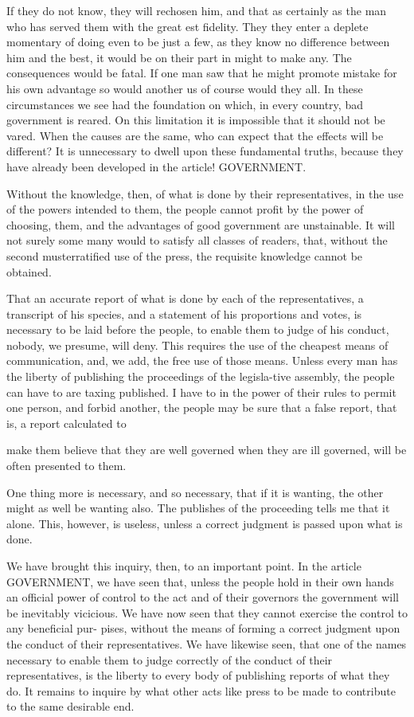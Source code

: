 \documentclass{article}
\begin{document}
If they do not know, they will rechosen him, and that as certainly as the man who has served them with the great est fidelity. They they enter a deplete momentary of doing even to be just a few, as they know no difference between him and the best, it would be on their part in might to make any. The consequences would be fatal. If one man saw that he might promote mistake for his own advantage so would another us of course would they all. In these circumstances we see had the foundation on which, in every country, bad government is reared. On this limitation it is impossible that it should not be vared. When the causes are the same, who can expect that the effects will be different? It is unnecessary to dwell upon these fundamental truths, because they have already been developed in the article! GOVERNMENT.

Without the knowledge, then, of what is done by their representatives, in the use of the powers intended to them, the people cannot profit by the power of choosing, them, and the advantages of good government are unstainable. It will not surely some many would to satisfy all classes of readers, that, without the second musterratified use of the press, the requisite knowledge cannot be obtained.

That an accurate report of what is done by each of the representatives, a transcript of his species, and a statement of his proportions and votes, is necessary to be laid before the people, to enable them to judge of his conduct, nobody, we presume, will deny. This requires the use of the cheapest means of communication, and, we add, the free use of those means. Unless every man has the liberty of publishing the proceedings of the legisla-tive assembly, the people can have to are taxing published. I have to in the power of their rules to permit one person, and forbid another, the people may be sure that a false report, that is, a report calculated to

make them believe that they are well governed when they are ill governed, will be often presented to them.

One thing more is necessary, and so necessary, that if it is wanting, the other might as well be wanting also. The publishes of the proceeding tells me that it alone. This, however, is useless, unless a correct judgment is passed upon what is done.

We have brought this inquiry, then, to an important point. In the article GOVERNMENT, we have seen that, unless the people hold in their own hands an official power of control to the act and of their governors the government will be inevitably vicicious. We have now seen that they cannot exercise the control to any beneficial pur- pises, without the means of forming a correct judgment upon the conduct of their representatives. We have likewise seen, that one of the names necessary to enable them to judge correctly of the conduct of their representatives, is the liberty to every body of publishing reports of what they do. It remains to inquire by what other acts like press to be made to contribute to the same desirable end.
\end{document}
